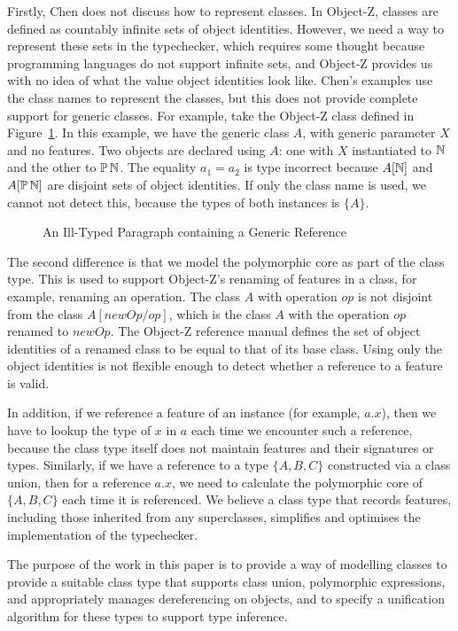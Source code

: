 Firstly, Chen does not discuss how to represent classes. In Object-Z,
classes are defined as countably infinite sets of object
identities. However, we need a way to represent these sets in the
typechecker, which requires some thought because programming languages
do not support infinite sets, and Object-Z provides us with no idea of
what the value object identities look like. Chen's examples use the
class names to represent the classes, but this does not provide
complete support for generic classes. For example, take the Object-Z
class defined in Figure~\ref{generic-class-A}.  In this example, we
have the generic class $A$, with generic parameter $X$ and no
features.  Two objects are declared using $A$: one with $X$
instantiated to ${\mathbb N}$ and the other to $\power \nat$. The equality
$a_{1} = a_{2}$ is type incorrect because $A[{\mathbb N}]$ and $A[\power
\nat]$ are disjoint sets of object identities. If only the class name
is used, we cannot not detect this, because the types of both
instances is $\{A\}$.

\begin{figure}[t]

\caption{An Ill-Typed Paragraph containing a Generic Reference}
\label{generic-class-A}
\end{figure}

The second difference is that we model the polymorphic core as part of
the class type. This is used to support Object-Z's renaming of
features in a class, for example, renaming an operation. The class $A$
with operation $op$ is not disjoint from the class $A[newOp/op]$,
which is the class $A$ with the operation $op$ renamed to $newOp$. The
Object-Z reference manual \cite{smith00} defines the set of object
identities of a renamed class to be equal to that of its base
class. Using only the object identities is not flexible enough to
detect whether a reference to a feature is valid.

In addition, if we reference a feature of an instance (for example,
$a.x$), then we have to lookup the type of $x$ in $a$ each time we
encounter such a reference, because the class type itself does not
maintain features and their signatures or types.  Similarly, if we
have a reference to a type $\{ A, B, C\}$ constructed via a class
union, then for a reference $a.x$, we need to calculate the
polymorphic core of $\{A,B,C\}$ each time it is referenced. We believe
a class type that records features, including those inherited from any
superclasses, simplifies and optimises the implementation of the
typechecker.

The purpose of the work in this paper is to provide a way of modelling
classes to provide a suitable class type that supports class union,
polymorphic expressions, and appropriately manages dereferencing on
objects, and to specify a unification algorithm for these types to
support type inference.

